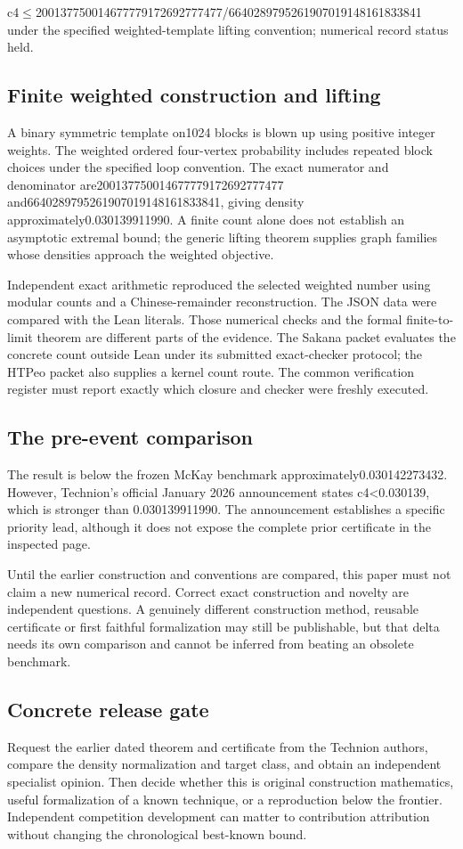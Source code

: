 \documentclass[11pt,a4paper]{article}
\begin{document}
c4\ensuremath{\leq}200137750014677779172692777477/6640289795261907019148161833841 under the specified weighted-template lifting convention; numerical record status held.

\subsection{Finite weighted construction and lifting}
A binary symmetric template on1024 blocks is blown up using positive integer weights. The weighted ordered four-vertex probability includes repeated block choices under the specified loop convention. The exact numerator and denominator are200137750014677779172692777477 and6640289795261907019148161833841, giving density approximately0.030139911990. A finite count alone does not establish an asymptotic extremal bound; the generic lifting theorem supplies graph families whose densities approach the weighted objective.

Independent exact arithmetic reproduced the selected weighted number using modular counts and a Chinese-remainder reconstruction. The JSON data were compared with the Lean literals. Those numerical checks and the formal finite-to-limit theorem are different parts of the evidence. The Sakana packet evaluates the concrete count outside Lean under its submitted exact-checker protocol; the HTPeo packet also supplies a kernel count route. The common verification register must report exactly which closure and checker were freshly executed.

\subsection{The pre-event comparison}
The result is below the frozen McKay benchmark approximately0.030142273432. However, Technion's official January 2026 announcement states c4<0.030139, which is stronger than 0.030139911990. The announcement establishes a specific priority lead, although it does not expose the complete prior certificate in the inspected page.

Until the earlier construction and conventions are compared, this paper must not claim a new numerical record. Correct exact construction and novelty are independent questions. A genuinely different construction method, reusable certificate or first faithful formalization may still be publishable, but that delta needs its own comparison and cannot be inferred from beating an obsolete benchmark.

\subsection{Concrete release gate}
Request the earlier dated theorem and certificate from the Technion authors, compare the density normalization and target class, and obtain an independent specialist opinion. Then decide whether this is original construction mathematics, useful formalization of a known technique, or a reproduction below the frontier. Independent competition development can matter to contribution attribution without changing the chronological best-known bound.
\end{document}
